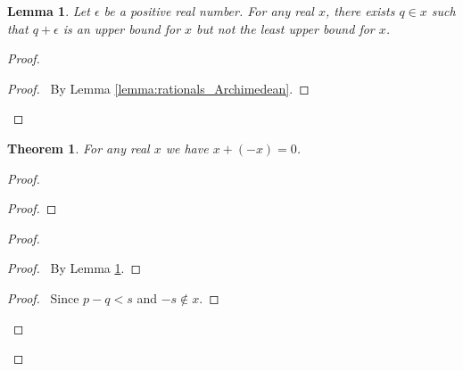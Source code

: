 \documentclass{article}
\let\qed\relax
\newtheorem{lemma}[axiom]{Lemma}
\newtheorem{theorem}[axiom]{Theorem}
\theoremstyle{definition}
\begin{document}
    \begin{lemma}
        \label{lemma:reals_pre_negation}
        Let $\epsilon$ be a positive real number. For any real $x$, there exists $q \in x$
        such that $q + \epsilon$ is an upper bound for $x$ but not the least upper bound for $x$.
    \end{lemma}

    \begin{proof}
        \pf
        \begin{proof}
            \pf\ By Lemma \ref{lemma:rationals_Archimedean}.
        \end{proof}
        \qed
    \end{proof}

    \begin{theorem}
        For any real $x$ we have $x + (-x) = 0$.
    \end{theorem}

    \begin{proof}
        \pf
        \begin{proof}
        \end{proof}
        \begin{proof}
            \begin{proof}
                \pf\ By Lemma \ref{lemma:reals_pre_negation}.
            \end{proof}
            \begin{proof}
                \pf\ Since $p-q < s$ and $-s \notin x$.
            \end{proof}
        \end{proof}
        \qed
    \end{proof}
\end{document}
